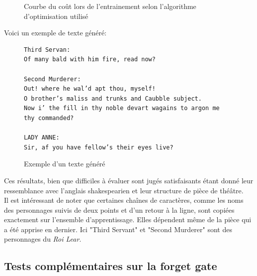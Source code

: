 \begin{figure}[H]
\centering
{}
\caption{Courbe du coût lors de l'entrainement selon l'algorithme d'optimisation utilisé}
\label{RMSProp_vs_SGD}
\end{figure}
\medskip

Voici un exemple de texte généré:

\medbreak

\begin{figure}[h!]
\begin{verbatim}
Third Servan:
Of many bald with him fire, read now?

Second Murderer:
Out! where he wal’d apt thou, myself!
O brother’s maliss and trunks and Caubble subject.
Now i’ the fill in thy noble devart wagains to argon me
thy commanded?

LADY ANNE:
Sir, af you have fellow’s their eyes live?
\end{verbatim}
\caption{Exemple d'un texte généré}
\end{figure}


Ces résultats, bien que difficiles à évaluer sont jugés satisfaisants étant donné leur ressemblance avec l'anglais shakespearien et leur structure de pièce de théâtre.
\\Il est intéressant de noter que certaines chaînes de caractères, comme les noms des personnages suivis de deux points et d'un retour à la ligne, sont copiées exactement sur l'ensemble d'apprentissage. Elles dépendent même de la pièce qui a été apprise en dernier. Ici "Third Servant" et "Second Murderer" sont des personnages du \textit{Roi Lear}.

\subsection{Tests complémentaires sur la forget gate}

